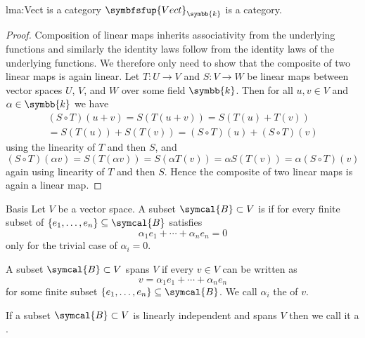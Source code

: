 \documentclass[fleqn]{NotesClass}
\makeatletter
\newcommand{\c@egory}[1]{\symbfsfup{#1}}
\renewcommand{\field}{\symbb{k}}
\newcommand{\Vect}[1][\field]{{\c@egory{Vect}_{#1}}}
\renewcommand{\ve}[1]{e_{#1}}
\makeatother
\begin{document}
    \begin{lma}{}{lma:Vect is a category}
        \(\Vect\) is a category.
        \begin{proof}
            Composition of linear maps inherits associativity from the underlying functions and similarly the identity laws follow from the identity laws of the underlying functions.
            We therefore only need to show that the composite of two linear maps is again linear.
            Let \(T \colon U \to V\) and \(S \colon V \to W\) be linear maps between vector spaces \(U\), \(V\), and \(W\) over some field \(\field\).
            Then for all \(u, v \in V\) and \(\alpha \in \field\) we have
            \begin{multline}
                (S \circ T)(u + v) = S(T(u + v)) = S(T(u) + T(v))\\
                = S(T(u)) + S(T(v)) = (S \circ T)(u) + (S \circ T)(v)
            \end{multline}
            using the linearity of \(T\) and then \(S\), and
            \begin{equation}
                (S \circ T)(\alpha v) = S(T(\alpha v)) = S(\alpha T(v)) = \alpha S(T(v)) = \alpha (S \circ T)(v)
            \end{equation}
            again using linearity of \(T\) and then \(S\).
            Hence the composite of two linear maps is again a linear map.
        \end{proof}
    \end{lma}
    
    \begin{dfn}{Basis}{}
        Let \(V\) be a vector space.
        A subset \(\symcal{B} \subset V\) is  if for every finite subset of \(\{\ve{1}, \dotsc, \ve{n}\} \subseteq \symcal{B}\) satisfies
        \begin{equation}
            \alpha_1 \ve{1} + \dotsb + \alpha_n \ve{n} = 0
        \end{equation}
        only for the trivial case of \(\alpha_i = 0\).
        
        A subset \(\symcal{B} \subset V\) spans \(V\) if every \(v \in V\) can be written as
        \begin{equation}
            v = \alpha_1\ve{1} + \dotsb + \alpha_n\ve{n}
        \end{equation}
        for some finite subset \(\{\ve{1}, \dotsc, \ve{n}\} \subseteq \symcal{B}\).
        We call \(\alpha_i\) the  of \(v\).
        
        If a subset \(\symcal{B} \subset V\) is linearly independent and spans \(V\) then we call it a .
    \end{dfn}
    
\end{document}
